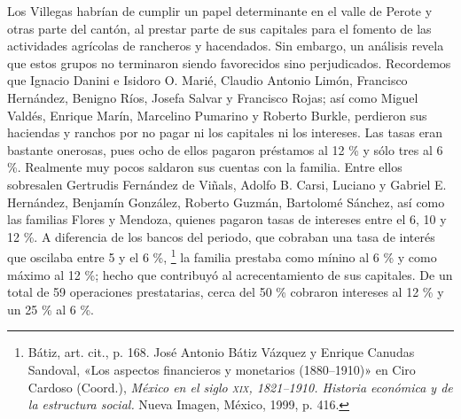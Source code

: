 \documentclass[14pt,twoside,final]{extbook} %
\let\oldfootnote\footnote
\renewcommand\footnote[1]{%
\oldfootnote{\hspace{1mm}#1}}
\begin{document}
Los Villegas habrían de cumplir un papel determinante en el valle de Perote y otras parte del cantón, al prestar parte de sus capitales para el fomento de las actividades agrícolas de rancheros y hacendados. Sin embargo, un análisis revela que estos grupos no terminaron siendo favorecidos sino perjudicados. Recordemos que Ignacio Danini e Isidoro O. Marié, Claudio Antonio Limón, Francisco Hernández, Benigno Ríos, Josefa Salvar y Francisco Rojas; así como Miguel Valdés, Enrique Marín, Marcelino Pumarino y Roberto Burkle, perdieron sus haciendas y ranchos por no pagar ni los capitales ni los intereses. Las tasas eran bastante onerosas, pues ocho de ellos pagaron préstamos al 12 \% y sólo tres al 6 \%. Realmente muy pocos saldaron sus cuentas con la familia. Entre ellos sobresalen Gertrudis Fernández de Viñals, Adolfo B. Carsi, Luciano y Gabriel E. Hernández, Benjamín González, Roberto Guzmán, Bartolomé Sánchez, así como las familias Flores y Mendoza, quienes pagaron tasas de intereses entre el 6, 10 y 12 \%. A diferencia de los bancos del periodo, que cobraban una tasa de interés que oscilaba entre 5 y el 6 \%,\footnote{Bátiz, art. cit., p. 168. José Antonio Bátiz Vázquez y Enrique Canudas Sandoval, «Los aspectos financieros y monetarios (1880--1910)» en Ciro Cardoso (Coord.), \emph{México en el siglo \textsc{xix}, 1821--1910. Historia económica y de la estructura social.} Nueva Imagen, México, 1999, p. 416.} la familia prestaba como mínino al 6 \% y como máximo al 12 \%; hecho que contribuyó al acrecentamiento de sus capitales. De un total de 59 operaciones prestatarias, cerca del 50 \% cobraron intereses al 12 \% y un 25 \% al 6 \%.
\end{document}
